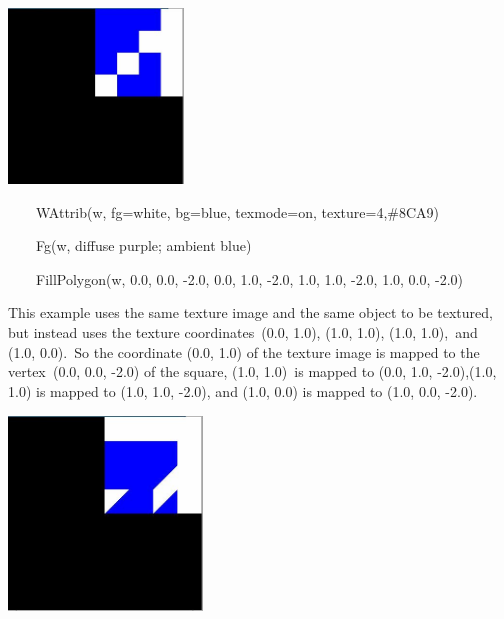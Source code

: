 \documentclass[letterpaper]{article}
\begin{document}
{\bigskip

{\centering  \includegraphics[width=1.8335in,height=1.8335in]{utr9/utr9-img030.jpg} \par}

\bigskip


\bigskip

{\sffamily
\ \ \ \ WAttrib(w, {\textquotedbl}fg=white{\textquotedbl}, {\textquotedbl}bg=blue{\textquotedbl},
{\textquotedbl}texmode=on{\textquotedbl}, {\textquotedbl}texture=4,\#8CA9{\textquotedbl})}

{\sffamily
\ \ \ \ Fg(w, {\textquotedbl}diffuse purple; ambient blue{\textquotedbl})}

{\sffamily
\ \ \ \ FillPolygon(w, 0.0, 0.0, -2.0, 0.0, 1.0, -2.0, 1.0, 1.0, -2.0, 1.0, 0.0, -2.0) }


\bigskip

{
This example uses the same texture image and the same object to be textured, but instead uses the texture
coordinates\texttt{ }\textsf{(0.0, 1.0)},\textsf{ (1.0, 1.0)},\textsf{ (1.0, 1.0)},\texttt{ }and\texttt{ }\textsf{(1.0,
0.0)}.\texttt{ }So the coordinate \textsf{(0.0, 1.0) }of the texture image is mapped to the vertex\texttt{
}\textsf{(0.0, 0.0, -2.0)} of the square, \textsf{(1.0, 1.0)}\texttt{ }is mapped to \textsf{(0.0, 1.0, -2.0),(1.0, 1.0)
}is mapped to \textsf{(1.0, 1.0, -2.0),} and \textsf{(1.0},\textsf{ 0.0) }is mapped to \textsf{(1.0, 0.0,
-2.0)}.\texttt{ }}


\bigskip

{\centering  \includegraphics[width=2.0307in,height=2.0311in]{utr9/utr9-img031.jpg} \par}

}
\end{document}
